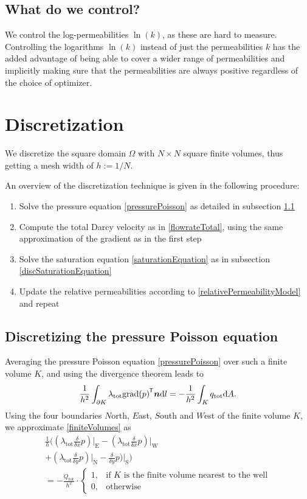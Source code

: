 \documentclass[twoside]{IEEEtran}
\DeclareMathOperator*{\grad}{grad}
\renewcommand*{\d}[1]{\ensuremath{\mathrm{d}#1}}
\newcommand*{\ddiff}[2]{\ensuremath{\frac{\delta}{\delta{#2}}{#1}}}
\renewcommand*{\vec}[1]{\ensuremath{{\bm{#1}}}}
\newcommand*{\transpose}[1]{{#1}^{\mkern-1.5mu\mathsf{T}}}
\newcommand*{\iprod}[3]{\ensuremath{\ifstrempty{#1}{\transpose{#2} {#3}}{\transpose{#1} {#2} {#3}}}}
\begin{document}
\subsection{What do we control?}
We control the log-permeabilities $\ln(k)$, as these are hard to measure.
Controlling the logarithms $\ln(k)$ instead of just the permeabilities $k$ has the added advantage of being able to cover a wider range of permeabilities and implicitly making sure that the permeabilities are always positive regardless of the choice of optimizer.

\section{Discretization}
\label{disc}
We discretize the square domain $\Omega$ with $N \times N$ square finite volumes, thus getting a mesh width of $h := 1/N$.

An overview of the discretization technique is given in the following procedure:
\begin{enumerate}
	\item Solve the pressure equation \eqref{pressurePoisson} as detailed in subsection \ref{discPressurePoisson}
	\item Compute the total Darcy velocity as in \eqref{flowrateTotal}, using the same approximation of the gradient as in the first step
	\item Solve the saturation equation \eqref{saturationEquation} as in subsection \ref{discSaturationEquation}
	\item Update the relative permeabilities according to \eqref{relativePermeabilityModel} and repeat
\end{enumerate}

\subsection{Discretizing the pressure Poisson equation}
\label{discPressurePoisson}
Averaging the pressure Poisson equation \eqref{pressurePoisson} over such a finite volume $K$, and using the divergence theorem leads to
\begin{equation}
\label{finiteVolumes}
\frac{1}{h^2} \int_{\partial K} \lambda_\text{tot} \iprod{}{\grad(p)}{\vec{n}} \d{l} = -\frac{1}{h^2} \int_K q_\text{tot} \d{A}.
\end{equation}
Using the four boundaries $N$orth, $E$ast, $S$outh and $W$est of the finite volume $K$, we approximate \eqref{finiteVolumes} as
\begin{multline}
\frac{1}{h}\biggr( (\lambda_\text{tot} \ddiff{p}{x})\lvert_\text{E} - (\lambda_\text{tot} \ddiff{p}{x})\lvert_\text{W} \\+ (\lambda_\text{tot}\ddiff{p}{y})\lvert_\text{N}
- \ddiff{p}{y})\lvert_\text{S} \biggr) \\= - \frac{Q_\text{tot}}{h^2} \cdot \begin{cases} 1, &\text{if } K \text{ is the finite volume nearest to the well} \\
0, & \text{otherwise} \end{cases}
\end{multline}
\end{document}
